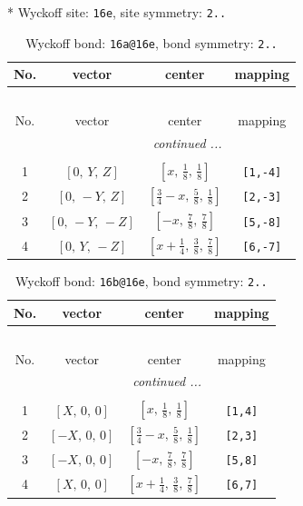 \documentclass[fleqn,8pt]{jsarticle}
\begin{document}
* Wyckoff site: {\tt 16e}, site symmetry: {\tt 2..}
\renewcommand{\arraystretch}{1.2}
\begin{longtable}{cccc}
\caption{Wyckoff bond: {\tt 16a@16e}, bond symmetry: {\tt 2..}}
 \\
 \hline \hline
No. & vector & center & mapping \\ \hline \endfirsthead

\multicolumn{3}{l}{\tablename\ \thetable{}} \\
 \hline \hline
No. & vector & center & mapping \\ \hline \endhead

 \hline \hline
\multicolumn{3}{r}{\footnotesize\it continued ...} \\ \endfoot

 \hline \hline
\multicolumn{3}{r}{} \\ \endlastfoot

1 & $\left[ 0,\, Y,\, Z \right]$ & $\left[ x,\, \frac{1}{8},\, \frac{1}{8} \right]$ & {\tt [1,-4]} \\ \hline
2 & $\left[ 0,\, - Y,\, Z \right]$ & $\left[ \frac{3}{4} - x,\, \frac{5}{8},\, \frac{1}{8} \right]$ & {\tt [2,-3]} \\ \hline
3 & $\left[ 0,\, - Y,\, - Z \right]$ & $\left[ - x,\, \frac{7}{8},\, \frac{7}{8} \right]$ & {\tt [5,-8]} \\ \hline
4 & $\left[ 0,\, Y,\, - Z \right]$ & $\left[ x + \frac{1}{4},\, \frac{3}{8},\, \frac{7}{8} \right]$ & {\tt [6,-7]} \\
\end{longtable}
\renewcommand{\arraystretch}{1.2}
\begin{longtable}{cccc}
\caption{Wyckoff bond: {\tt 16b@16e}, bond symmetry: {\tt 2..}}
 \\
 \hline \hline
No. & vector & center & mapping \\ \hline \endfirsthead

\multicolumn{3}{l}{\tablename\ \thetable{}} \\
 \hline \hline
No. & vector & center & mapping \\ \hline \endhead

 \hline \hline
\multicolumn{3}{r}{\footnotesize\it continued ...} \\ \endfoot

 \hline \hline
\multicolumn{3}{r}{} \\ \endlastfoot

1 & $\left[ X,\, 0,\, 0 \right]$ & $\left[ x,\, \frac{1}{8},\, \frac{1}{8} \right]$ & {\tt [1,4]} \\ \hline
2 & $\left[ - X,\, 0,\, 0 \right]$ & $\left[ \frac{3}{4} - x,\, \frac{5}{8},\, \frac{1}{8} \right]$ & {\tt [2,3]} \\ \hline
3 & $\left[ - X,\, 0,\, 0 \right]$ & $\left[ - x,\, \frac{7}{8},\, \frac{7}{8} \right]$ & {\tt [5,8]} \\ \hline
4 & $\left[ X,\, 0,\, 0 \right]$ & $\left[ x + \frac{1}{4},\, \frac{3}{8},\, \frac{7}{8} \right]$ & {\tt [6,7]} \\
\end{longtable}
\end{document}
